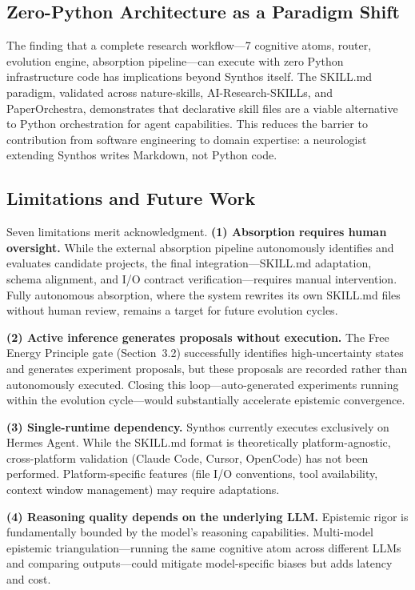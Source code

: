 \documentclass[review]{elsarticle}
\begin{document}
\subsection{Zero-Python Architecture as a Paradigm Shift}

The finding that a complete research workflow---7 cognitive atoms, router, evolution engine, absorption pipeline---can execute with zero Python infrastructure code has implications beyond Synthos itself. The SKILL.md paradigm, validated across nature-skills, AI-Research-SKILLs, and PaperOrchestra, demonstrates that declarative skill files are a viable alternative to Python orchestration for agent capabilities. This reduces the barrier to contribution from software engineering to domain expertise: a neurologist extending Synthos writes Markdown, not Python code.

\subsection{Limitations and Future Work}
\label{sec:limitations}

Seven limitations merit acknowledgment. \textbf{(1) Absorption requires human oversight.} While the external absorption pipeline autonomously identifies and evaluates candidate projects, the final integration---SKILL.md adaptation, schema alignment, and I/O contract verification---requires manual intervention. Fully autonomous absorption, where the system rewrites its own SKILL.md files without human review, remains a target for future evolution cycles.

\textbf{(2) Active inference generates proposals without execution.} The Free Energy Principle gate (Section~3.2) successfully identifies high-uncertainty states and generates experiment proposals, but these proposals are recorded rather than autonomously executed. Closing this loop---auto-generated experiments running within the evolution cycle---would substantially accelerate epistemic convergence.

\textbf{(3) Single-runtime dependency.} Synthos currently executes exclusively on Hermes Agent. While the SKILL.md format is theoretically platform-agnostic, cross-platform validation (Claude Code, Cursor, OpenCode) has not been performed. Platform-specific features (file I/O conventions, tool availability, context window management) may require adaptations.

\textbf{(4) Reasoning quality depends on the underlying LLM.} Epistemic rigor is fundamentally bounded by the model's reasoning capabilities. Multi-model epistemic triangulation---running the same cognitive atom across different LLMs and comparing outputs---could mitigate model-specific biases but adds latency and cost.
\end{document}

